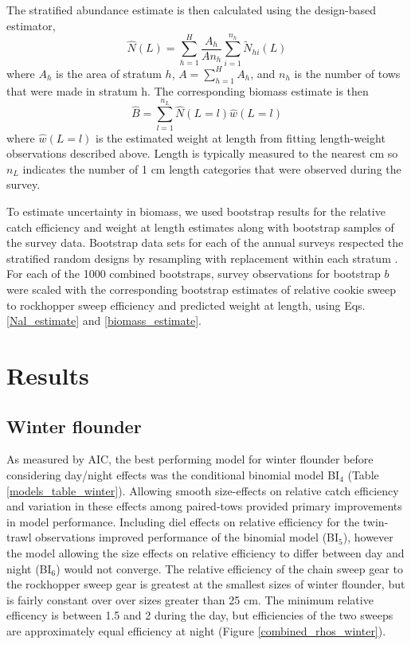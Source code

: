 \documentclass[]{article}
\begin{document}
The stratified abundance estimate is then calculated using the
design-based estimator, \begin{equation}\label{Nal_estimate}
 \widehat N(L) = \sum^H_{h=1} \frac{A_h}{An_h}\sum^{n_h}_{i=1} \widetilde N_{hi}(L)
\end{equation} where \(A_h\) is the area of stratum \(h\),
\(A=\sum^H_{h=1} A_h\), and \(n_h\) is the number of tows that were made
in stratum h. The corresponding biomass estimate is then
\begin{equation}\label{biomass_estimate}
 \widehat B = \sum^{n_L}_{l=1} \widehat N(L = l) \widehat w(L=l)
\end{equation} where \(\widehat w(L=l)\) is the estimated weight at
length from fitting length-weight observations described above. Length
is typically measured to the nearest cm so \(n_L\) indicates the number
of 1 cm length categories that were observed during the survey.

To estimate uncertainty in biomass, we used bootstrap results for the
relative catch efficiency and weight at length estimates along with
bootstrap samples of the survey data. Bootstrap data sets for each of
the annual surveys respected the stratified random designs by resampling
with replacement within each stratum \citep{smith97}. For each of the
1000 combined bootstraps, survey observations for bootstrap \(b\) were
scaled with the corresponding bootstrap estimates of relative cookie
sweep to rockhopper sweep efficiency and predicted weight at length,
using Eqs. \ref{Nal_estimate} and \ref{biomass_estimate}.

\hypertarget{results}{%
\section{Results}\label{results}}

\hypertarget{winter-flounder}{%
\subsection{Winter flounder}\label{winter-flounder}}

As measured by AIC, the best performing model for winter flounder before
considering day/night effects was the conditional binomial model
BI\(_4\) (Table \ref{models_table_winter}). Allowing smooth size-effects
on relative catch efficiency and variation in these effects among
paired-tows provided primary improvements in model performance.
Including diel effects on relative efficiency for the twin-trawl
observations improved performance of the binomial model (BI\(_5\)),
however the model allowing the size effects on relative efficiency to
differ between day and night (BI\(_6\)) would not converge. The relative
efficiency of the chain sweep gear to the rockhopper sweep gear is
greatest at the smallest sizes of winter flounder, but is fairly
constant over over sizes greater than 25 cm. The minimum relative
efficency is between 1.5 and 2 during the day, but efficiencies of the
two sweeps are approximately equal efficiency at night (Figure
\ref{combined_rhos_winter}).
\end{document}
